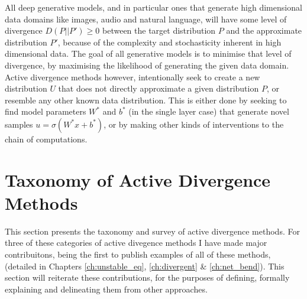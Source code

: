 All deep generative models, and in particular ones that generate high dimensional data domains like images, audio and natural language, will have some level of divergence $D(P||P') \geq 0$ between the target distribution $P$ and the approximate distribution $P'$, because of the complexity and stochasticity inherent in high dimensional data. 
The goal of all generative models is to minimise that level of divergence, by maximising the likelihood of generating the given data domain. 
Active divergence methods however, intentionally seek to create a new distribution $U$ that does not directly approximate a given distribution $P$, or resemble any other known data distribution. 
This is either done by seeking to find model parameters $W^*$ and $b^*$ (in the single layer case) that generate novel samples $u = \sigma(W^*x+b^*)$, or by making other kinds of interventions to the chain of computations.



\section{Taxonomy of Active Divergence Methods}

This section presents the taxonomy and survey of active divergence methods. 
For three of these categories of active divegence methods I have made major contribuitons, being the first to publish examples of all of these methods, (detailed in Chapters \ref{ch:unstable_eq}, \ref{ch:divergent} \& \ref{ch:net_bend}).
This section will reiterate these contributions, for the purposes of defining, formally explaining and delineating them from other approaches.

